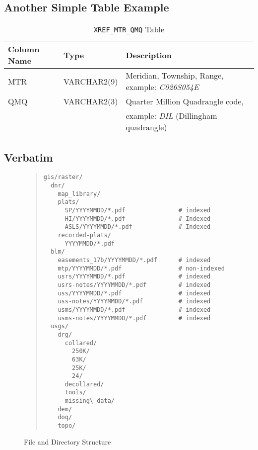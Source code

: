 \documentclass[12pt,letterpaper,dvips]{article}
\newcommand{\cmd}[1]{\texttt{#1}}
\begin{document}
\subsection{Another Simple Table Example}
\begin{table}[htb]
\begin{tabular}{|p{}|p{}|p{}|}\hline 
Column Name&Type&Description\\ 
\hline
MTR&VARCHAR2(9)&Meridian, Township, Range, example: \emph{C026S054E}\\
QMQ&VARCHAR2(3)&Quarter Million Quadrangle code,\\
&&\hspace{10pt}example: \emph{DIL} (Dillingham quadrangle)\\
\hline
\end{tabular}
\caption {\cmd{XREF\_MTR\_QMQ} Table}
\label{table:xref_mtr_qmq}
\end{table}

\newpage
\subsection{Verbatim}

\begin{center}
\begin{figure}
\begin{quote}
\small
\begin{Verbatim}[frame=none]
gis/raster/
  dnr/
    map_library/
    plats/
      SP/YYYYMMDD/*.pdf               # indexed
      HI/YYYYMMDD/*.pdf               # Indexed
      ASLS/YYYYMMDD/*.pdf             # Indexed
    recorded-plats/
      YYYYMMDD/*.pdf
  blm/
    easements_17b/YYYYMMDD/*.pdf      # indexed
    mtp/YYYYMMDD/*.pdf                # non-indexed
    usrs/YYYYMMDD/*.pdf               # indexed
    usrs-notes/YYYYMMDD/*.pdf         # indexed
    uss/YYYYMMDD/*.pdf                # indexed
    uss-notes/YYYYMMDD/*.pdf          # indexed
    usms/YYYYMMDD/*.pdf               # indexed
    usms-notes/YYYYMMDD/*.pdf         # indexed
  usgs/
    drg/
      collared/ 
        250K/
        63K/
        25K/
        24/
      decollared/
      tools/
      missing\_data/
    dem/
    doq/
    topo/
\end{Verbatim}
\normalsize
\end{quote}
\caption{File and Directory Structure}
\label{fig:dirlayout}
\end{figure}
\end{center}
\end{document}
